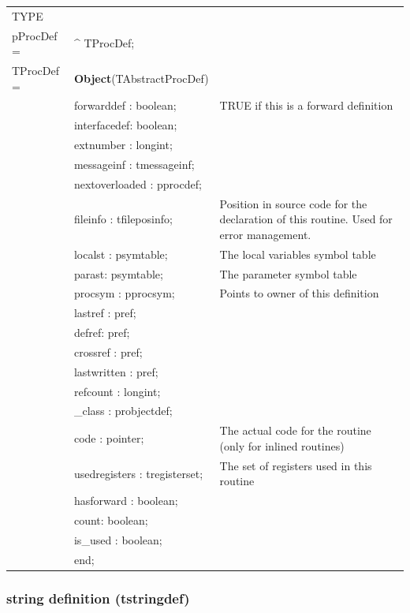 \documentclass [12pt]{article}
\begin{document}
\begin{tabular*}{6.5in}{|l@{\extracolsep{\fill}}lp{7.8cm}|}
\hline
\textsf{TYPE} & &  \\
\xspace pProcDef = & \^{}  TProcDef; & \\
\xspace \textsf{TProcDef} = & \textbf{Object}(TAbstractProcDef) & \\
&\textsf{forwarddef : boolean;}& TRUE if this is a forward definition \\
&\textsf{interfacedef: boolean;}&  \\
&\textsf{extnumber : longint;}&  \\
&\textsf{messageinf : tmessageinf;}&  \\
&\textsf{nextoverloaded : pprocdef;}&  \\
&\textsf{fileinfo : tfileposinfo;}& 
	Position in source code for the declaration of this routine. Used
	for error management. \\
&\textsf{localst : psymtable;}& The local variables symbol table \\
&\textsf{parast: psymtable;}& The parameter symbol table \\
&\textsf{procsym : pprocsym;}& Points to owner of this definition \\
&\textsf{lastref : pref;}&  \\
&\textsf{defref: pref;}&  \\
&\textsf{crossref : pref;}&  \\
&\textsf{lastwritten : pref;}&  \\
&\textsf{refcount : longint;}&  \\
&\textsf{{\_}class : probjectdef;}&  \\
&\textsf{code : pointer;}& 
	The actual code for the routine (only for inlined routines) \\
&\textsf{usedregisters : tregisterset;}& 
	The set of registers used in this routine \\
&\textsf{hasforward : boolean;}&  \\
&\textsf{count: boolean;}&  \\
&\textsf{is{\_}used : boolean;}&  \\
&\textsf{end;}&  \\
\hline
\end{tabular*}

\subsubsection{string definition (tstringdef)}
\label{subsubsec:string}
\end{document}
